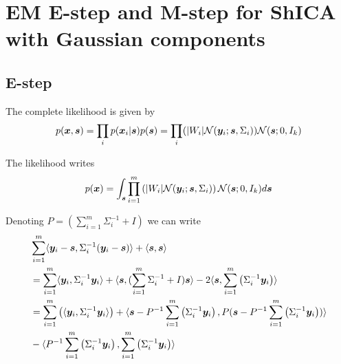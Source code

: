 \section{EM E-step and M-step for ShICA with Gaussian components}
  \subsection{E-step}
  \label{conditional_density}
  The complete likelihood is given by
\begin{equation}
  p(\boldsymbol{x}, \boldsymbol{s}) = \prod_i p(\boldsymbol{x}_i | \boldsymbol{s}) p(\boldsymbol{s})=  \prod_i (|W_i| \mathcal{N}(\boldsymbol{y}_i; \boldsymbol{s}, \Sigma_i)) \mathcal{N}(\boldsymbol{s}; 0, I_k)
\end{equation}

The likelihood writes
\begin{align}
  p(\boldsymbol{x}) &= \int_{\boldsymbol{s}} \prod_{i=1}^m \left(|W_i| \mathcal{N}(\boldsymbol{y}_i; \boldsymbol{s}, \Sigma_i) \right) \mathcal{N}(\boldsymbol{s}; 0, I_k) d \boldsymbol{s} \\
\end{align}

Denoting $P = (\sum_{i=1}^m \Sigma_i^{-1} + I)$ we can write
\begin{align}
  &\sum_{i=1}^m \langle \boldsymbol{y}_i - \boldsymbol{s}, \Sigma_i^{-1} (\boldsymbol{y}_i - \boldsymbol{s}) \rangle + \langle \boldsymbol{s} , \boldsymbol{s} \rangle \\
  &=  \sum_{i=1}^m \langle \boldsymbol{y}_i , \Sigma_i^{-1} \boldsymbol{y}_i\rangle + \langle \boldsymbol{s} ,(\sum_{i=1}^m \Sigma_i^{-1} + I) \boldsymbol{s} \rangle  -2 \langle \boldsymbol{s} ,\sum_{i=1}^m \left(\Sigma_i^{-1} \boldsymbol{y}_i \right) \rangle \\
  &=  \sum_{i=1}^m \left(\langle \boldsymbol{y}_i , \Sigma_i^{-1} \boldsymbol{y}_i\rangle \right)  +\langle \boldsymbol{s}  - P^{-1}  \sum_{i=1}^m \left(\Sigma_i^{-1} \boldsymbol{y}_i \right) , P (\boldsymbol{s} - P^{-1} \sum_{i=1}^m \left(\Sigma_i^{-1} \boldsymbol{y}_i \right)) \rangle   \\&- \langle P^{-1} \sum_{i=1}^m \left(\Sigma_i^{-1} \boldsymbol{y}_i \right) , \sum_{i=1}^m \left(\Sigma_i^{-1} \boldsymbol{y}_i \right) \rangle 
\end{align}

